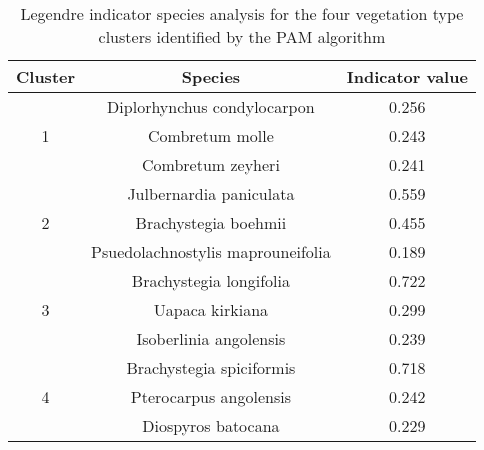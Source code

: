\begin{table}[ht]
\centering
\caption{Legendre indicator species analysis for the four vegetation type clusters identified by the PAM algorithm}
\begin{tabular}{ccc}
  \hline
Cluster & Species & Indicator value \\ 
  \hline
  \multirow{3}{*}{1} & Diplorhynchus condylocarpon & 0.256 \\
    & Combretum molle & 0.243 \\ 
    & Combretum zeyheri & 0.241 \\ 
  \hline
  \multirow{3}{*}{2} & Julbernardia paniculata & 0.559 \\
    & Brachystegia boehmii & 0.455 \\ 
    & Psuedolachnostylis maprouneifolia & 0.189 \\ 
  \hline
  \multirow{3}{*}{3} & Brachystegia longifolia & 0.722 \\
    & Uapaca kirkiana & 0.299 \\ 
    & Isoberlinia angolensis & 0.239 \\ 
  \hline
  \multirow{3}{*}{4} & Brachystegia spiciformis & 0.718 \\
    & Pterocarpus angolensis & 0.242 \\ 
    & Diospyros batocana & 0.229 \\ 
   \hline
\end{tabular}
\label{indval}
\end{table}

